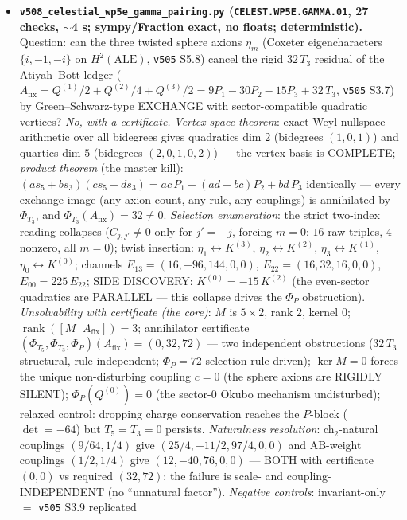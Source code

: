 \documentclass[11pt]{article}
\begin{document}
\begin{itemize}[leftmargin=1.5em]
\item \textbf{\texttt{v508\_celestial\_wp5e\_gamma\_pairing.py} (\texttt{CELEST.WP5E.GAMMA.01}, 27
checks, $\sim$4 s; sympy/Fraction exact, no floats; deterministic).} Question: can the three
twisted sphere axions $\eta_m$ (Coxeter eigencharacters $\{i,-1,-i\}$ on $H^2(\mathrm{ALE})$,
\texttt{v505} S5.8) cancel the rigid $32\,T_3$ residual of the Atiyah--Bott ledger
($A_{\mathrm{fix}}=Q^{(1)}/2{+}Q^{(2)}/4{+}Q^{(3)}/2=9P_1{-}30P_2{-}15P_3{+}32\,T_3$,
\texttt{v505} S3.7) by Green--Schwarz-type EXCHANGE with sector-compatible quadratic vertices?
\emph{No, with a certificate.} \emph{Vertex-space theorem}: exact Weyl nullspace arithmetic over
all bidegrees gives quadratics dim $2$ (bidegrees $(1,0,1)$) and quartics dim $5$ (bidegrees
$(2,0,1,0,2)$) --- the vertex basis is COMPLETE; \emph{product theorem} (the master kill):
$(a s_5{+}b s_3)(c s_5{+}d s_3)=ac\,P_1{+}(ad{+}bc)P_2{+}bd\,P_3$ identically --- every exchange
image (any axion count, any rule, any couplings) is annihilated by $\Phi_{T_3}$, and
$\Phi_{T_3}(A_{\mathrm{fix}})=32\neq0$. \emph{Selection enumeration}: the strict two-index reading
collapses ($C_{j,j'}\neq0$ only for $j'=-j$, forcing $m=0$: $16$ raw triples, $4$ nonzero, all
$m=0$); twist insertion: $\eta_1{\leftrightarrow}K^{(3)}$, $\eta_2{\leftrightarrow}K^{(2)}$,
$\eta_3{\leftrightarrow}K^{(1)}$, $\eta_0{\leftrightarrow}K^{(0)}$; channels
$E_{13}=(16,-96,144,0,0)$, $E_{22}=(16,32,16,0,0)$, $E_{00}=225\,E_{22}$; SIDE DISCOVERY:
$K^{(0)}=-15\,K^{(2)}$ (the even-sector quadratics are PARALLEL --- this collapse drives the
$\Phi_P$ obstruction). \emph{Unsolvability with certificate (the core)}: $M$ is $5{\times}2$,
rank $2$, kernel $0$; $\operatorname{rank}([M\,|\,A_{\mathrm{fix}}])=3$; annihilator certificate
$(\Phi_{T_5},\Phi_{T_3},\Phi_P)(A_{\mathrm{fix}})=(0,32,72)$ --- two independent obstructions
($32\,T_3$ structural, rule-independent; $\Phi_P=72$ selection-rule-driven); $\ker M=0$ forces
the unique non-disturbing coupling $c=0$ (the sphere axions are RIGIDLY SILENT);
$\Phi_P(Q^{(0)})=0$ (the sector-$0$ Okubo mechanism undisturbed); relaxed control: dropping
charge conservation reaches the $P$-block ($\det=-64$) but $T_5=T_3=0$ persists.
\emph{Naturalness resolution}: ch$_2$-natural couplings $(9/64,1/4)$ give
$(25/4,-11/2,97/4,0,0)$ and AB-weight couplings $(1/2,1/4)$ give $(12,-40,76,0,0)$ --- BOTH with
certificate $(0,0)$ vs required $(32,72)$: the failure is scale- and coupling-INDEPENDENT (no
``unnatural factor''). \emph{Negative controls}: invariant-only $=$ \texttt{v505} S3.9 replicated

\end{itemize}
\end{document}
